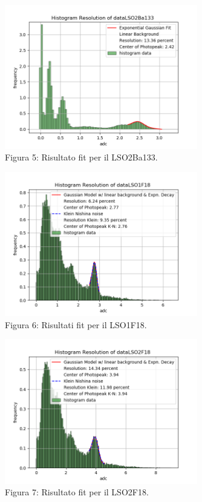 \documentclass[a4paper]{article}
\begin{document}
\begin{figure}[H]
\centering
\includegraphics[width=0.75\textwidth]{histdataLSO2Ba133}
\caption{Figura 5: Risultato fit per il LSO2Ba133.}
\end{figure}
\begin{figure}[H]
\centering
\includegraphics[width=0.75\textwidth]{histkleindataLSO1F18}
\caption{Figura 6: Risultati fit per il LSO1F18.}
\end{figure}
\begin{figure}[H]
\centering
\includegraphics[width=0.75\textwidth]{histkleindataLSO2F18}
\caption{Figura 7: Risultato fit per il LSO2F18.}
\end{figure}
\end{document}
